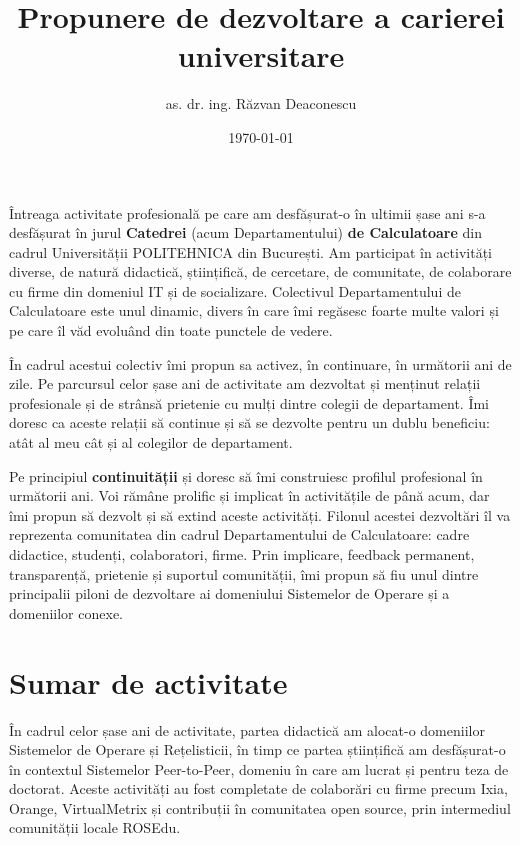 \documentclass[11pt,a4paper]{article}
\title{Propunere de dezvoltare a carierei universitare}
\author{as. dr. ing. Răzvan Deaconescu}
\date{\today}
\begin{document}
\maketitle


Întreaga activitate profesională pe care am desfășurat-o în ultimii șase ani
s-a desfășurat în jurul \textbf{Catedrei} (acum Departamentului) \textbf{de
Calculatoare} din cadrul Universității POLITEHNICA din București. Am
participat în activități diverse, de natură didactică, științifică, de
cercetare, de comunitate, de colaborare cu firme din domeniul IT și de
socializare.  Colectivul Departamentului de Calculatoare este unul dinamic,
divers în care îmi regăsesc foarte multe valori și pe care îl văd evoluând din
toate punctele de vedere.

În cadrul acestui colectiv îmi propun sa activez, în continuare, în următorii
ani de zile. Pe parcursul celor șase ani de activitate am dezvoltat și
menținut relații profesionale și de strânsă prietenie cu mulți dintre colegii
de departament. Îmi doresc ca aceste relații să continue și să se dezvolte
pentru un dublu beneficiu: atât al meu cât și al colegilor de departament.

Pe principiul \textbf{continuității} și doresc să îmi construiesc profilul
profesional în următorii ani. Voi rămâne prolific și implicat în activitățile
de până acum, dar îmi propun să dezvolt și să extind aceste activități.
Filonul acestei dezvoltări îl va reprezenta comunitatea din cadrul
Departamentului de Calculatoare: cadre didactice, studenți, colaboratori,
firme. Prin implicare, feedback permanent, transparență, prietenie și suportul
comunității, îmi propun să fiu unul dintre principalii piloni de dezvoltare ai
domeniului Sistemelor de Operare și a domeniilor conexe.

\section*{Sumar de activitate}

În cadrul celor șase ani de activitate, partea didactică am alocat-o
domeniilor Sistemelor de Operare și Rețelisticii, în timp ce partea
științifică am desfășurat-o în contextul Sistemelor Peer-to-Peer, domeniu în
care am lucrat și pentru teza de doctorat. Aceste activități au fost
completate de colaborări cu firme precum Ixia, Orange, VirtualMetrix și
contribuții în comunitatea open source, prin intermediul comunității locale
ROSEdu.
\end{document}
